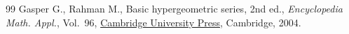 \begin{thebibliography}{99}
Gasper G., Rahman M., Basic hypergeometric series, 2nd ed., \textit{Encyclopedia Math.
 Appl.}, Vol.~96, \href{https://doi.org/10.1017/CBO9780511526251}{Cambridge University Press}, Cambridge, 2004.

\end{thebibliography}
